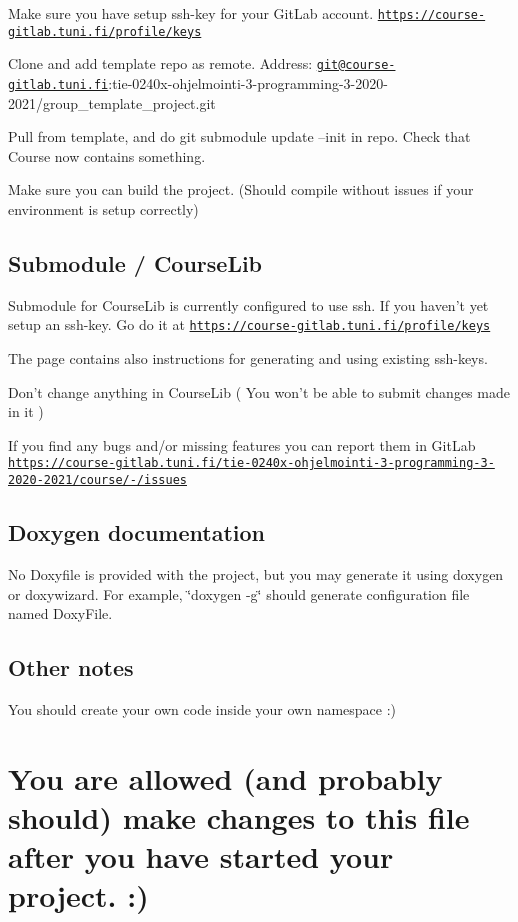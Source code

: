 
\begin{DoxyEnumerate}
\item Make sure you have setup ssh-\/key for your Git\-Lab account. \href{https://course-gitlab.tuni.fi/profile/keys}{\tt https\-://course-\/gitlab.\-tuni.\-fi/profile/keys}
\item Clone and add template repo as remote. Address\-: \href{mailto:git@course-gitlab.tuni.fi}{\tt git@course-\/gitlab.\-tuni.\-fi}\-:tie-\/0240x-\/ohjelmointi-\/3-\/programming-\/3-\/2020-\/2021/group\-\_\-template\-\_\-project.\-git
\item Pull from template, and do git submodule update --init in repo. Check that Course now contains something.
\item Make sure you can build the project. (Should compile without issues if your environment is setup correctly)
\end{DoxyEnumerate}

\subsection*{Submodule / Course\-Lib}

Submodule for Course\-Lib is currently configured to use ssh. If you haven't yet setup an ssh-\/key. Go do it at \href{https://course-gitlab.tuni.fi/profile/keys}{\tt https\-://course-\/gitlab.\-tuni.\-fi/profile/keys}

The page contains also instructions for generating and using existing ssh-\/keys.

Don't change anything in Course\-Lib ( You won't be able to submit changes made in it )

If you find any bugs and/or missing features you can report them in Git\-Lab \href{https://course-gitlab.tuni.fi/tie-0240x-ohjelmointi-3-programming-3-2020-2021/course/-/issues}{\tt https\-://course-\/gitlab.\-tuni.\-fi/tie-\/0240x-\/ohjelmointi-\/3-\/programming-\/3-\/2020-\/2021/course/-\//issues}

\subsection*{Doxygen documentation}

No Doxyfile is provided with the project, but you may generate it using doxygen or doxywizard. For example, \char`\"{}doxygen -\/g\char`\"{} should generate configuration file named Doxy\-File.

\subsection*{Other notes}

You should create your own code inside your own namespace \-:)

\section*{You are allowed (and probably should) make changes to this file after you have started your project. \-:)}
